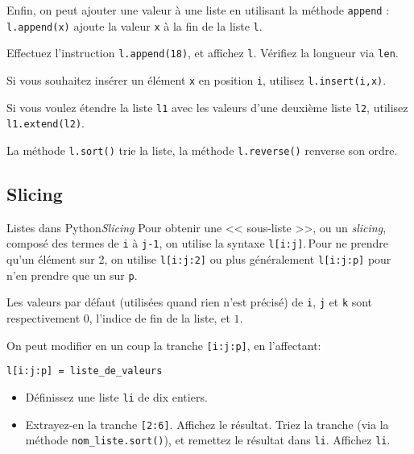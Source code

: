 \begin{frame}[fragile]
	Enfin, on peut ajouter une valeur à une liste en utilisant la méthode \lstinline|append| : \lstinline|l.append(x)| ajoute la valeur \lstinline|x| à la fin de la liste \lstinline|l|.

	\begin{exem}
		Effectuez l'instruction \lstinline|l.append(18)|, et affichez \lstinline|l|. Vérifiez la longueur via \lstinline|len|.
	\end{exem}
	\pause
	
	Si vous souhaitez insérer un élément \lstinline|x| en position \lstinline|i|, utilisez \lstinline|l.insert(i,x)|.
	\pause
	
	Si vous voulez étendre la liste \lstinline|l1| avec les valeurs d'une deuxième liste \lstinline|l2|, utilisez \lstinline|l1.extend(l2)|.
	\pause
	
	La méthode \lstinline|l.sort()| trie la liste, la méthode \lstinline|l.reverse()| renverse son ordre.
\end{frame}

\subsection{Slicing}

\begin{frame}[fragile]{Listes dans Python}{\textit{Slicing}}
	Pour obtenir une << sous-liste >>, ou un \textit{slicing}, composé des termes de \lstinline|i| à \lstinline|j-1|, on utilise la syntaxe \lstinline|l[i:j]|.\pause \,Pour ne prendre qu'un élément sur 2, on utilise \lstinline|l[i:j:2]| ou plus généralement \lstinline|l[i:j:p]| pour n'en prendre que un sur \lstinline|p|.\pause 
	
	Les valeurs par défaut (utilisées quand rien n'est précisé) de \lstinline|i|, \lstinline|j| et \lstinline|k| sont respectivement $0$, l'indice de fin de la liste, et $1$.\pause
	
	On peut modifier en un coup la tranche \lstinline|[i:j:p]|, en l'affectant:
	\begin{lstlisting}l[i:j:p] = liste_de_valeurs
	\end{lstlisting}
	
	\begin{exo}
		\begin{itemize}[<+->]
			\item Définissez une liste \lstinline|li| de dix entiers.
			\item Extrayez-en la tranche \lstinline|[2:6]|. Affichez le résultat. Triez la tranche (via la méthode \lstinline|nom_liste.sort()|), et remettez le résultat dans \lstinline|li|. Affichez \lstinline|li|.
		\end{itemize}
	\end{exo}
\end{frame}

